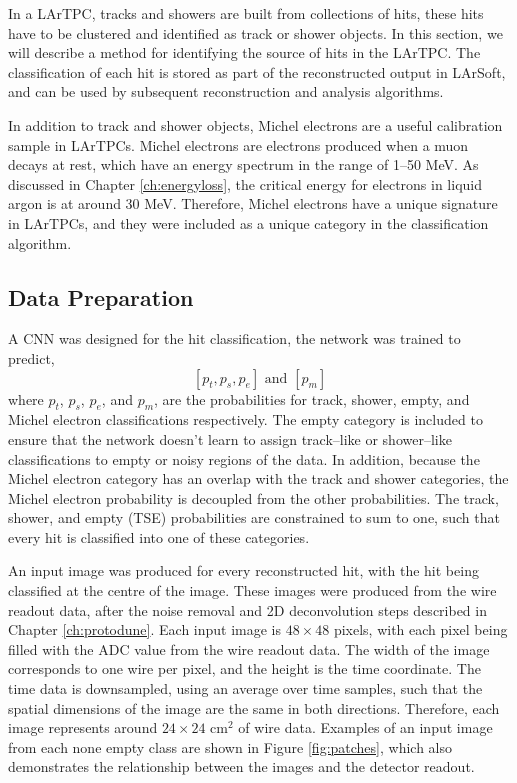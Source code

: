 In a LArTPC, tracks and showers are built from collections of hits, these hits
have to be clustered and identified as track or shower objects. In this section,
we will describe a method for identifying the source of hits in the \protodune{}
LArTPC. The classification of each hit is stored as part of the reconstructed
output in LArSoft, and can be used by subsequent reconstruction and analysis
algorithms.

In addition to track and shower objects, Michel electrons are a useful 
calibration sample in LArTPCs. Michel electrons are electrons produced when a 
muon decays at rest, which have an energy spectrum in the range of 1--50 MeV. 
As discussed in Chapter \ref{ch:energyloss}, the critical energy for electrons 
in liquid argon is at around 30 MeV. Therefore, Michel electrons have a unique 
signature in LArTPCs, and they were included as a unique category in the 
classification algorithm.

\subsection{Data Preparation}

A CNN was designed for the hit classification, the network was trained to
predict,
\begin{equation*}
	\left[ p_t, p_s, p_e \right] \mbox{ and } \left[ p_m \right]
\end{equation*}
where $p_t$, $p_s$, $p_e$, and $p_m$, are the probabilities for track, shower,
empty, and Michel electron classifications respectively. The empty category is
included to ensure that the network doesn't learn to assign track--like or
shower--like classifications to empty or noisy regions of the data. In addition,
because the Michel electron category has an overlap with the track and shower
categories, the Michel electron probability is decoupled from the other
probabilities. The track, shower, and empty (TSE) probabilities are 
constrained to sum to one, such that every hit is classified into one of these 
categories.

An input image was produced for every reconstructed hit, with the hit being
classified at the centre of the image. These images were produced from the 
wire readout data, after the noise removal and 2D deconvolution steps 
described in Chapter \ref{ch:protodune}. Each input image is $48 \times 48$
pixels, with each pixel being filled with the ADC value from the wire readout
data.  The width of the image corresponds to one wire per pixel, and 
the height is the time coordinate. The time data is downsampled, using an 
average over time samples, such that the spatial dimensions of the image are 
the same in both directions. Therefore, each image represents around $24 
\times 24 \mbox{ cm}^2$ of wire data. Examples of an input image from each 
none empty class are shown in Figure \ref{fig:patches}, which also 
demonstrates the relationship between the images and the detector readout.

